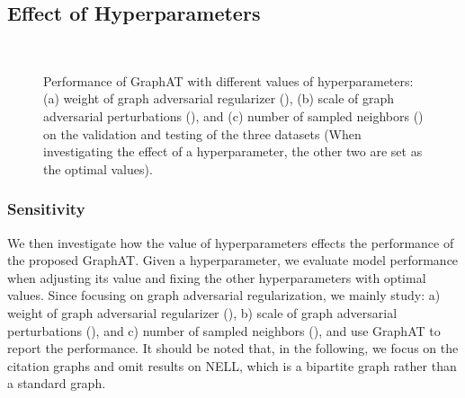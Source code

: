 \documentclass[10pt,journal,compsoc]{IEEEtran}
\begin{document}
\subsection{Effect of Hyperparameters}
\begin{figure*}[]
	\centering
	\mbox{
		\hspace{-0.1in}
		\hspace{-0.15in}
		\hspace{-0.15in}
	}
	\vspace{-0.3cm}
	\caption{Performance of GraphAT with different values of hyperparameters: (a) weight of graph adversarial regularizer (), (b) scale of graph adversarial perturbations (), and (c) number of sampled neighbors () on the validation and testing of the three datasets (When investigating the effect of a hyperparameter, the other two are set as the optimal values).
	}
	\label{fig:para_tune}
\end{figure*}
\subsubsection{Sensitivity}
We then investigate how the value of hyperparameters effects the performance of the proposed GraphAT. Given a hyperparameter, we evaluate model performance when adjusting its value and fixing the other hyperparameters with optimal values. Since focusing on graph adversarial regularization, we mainly study: a) weight of graph adversarial regularizer (), b) scale of graph adversarial perturbations (), and c) number of sampled neighbors (), and use GraphAT to report the performance. It should be noted that, in the following, we focus on the citation graphs and omit results on NELL, which is a bipartite graph rather than a standard graph.
\end{document}

